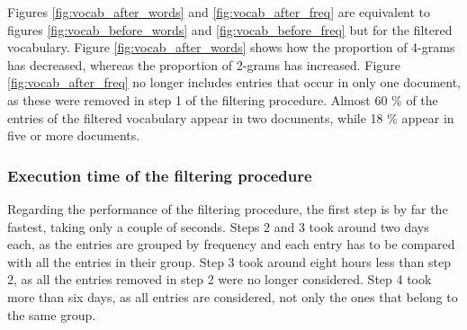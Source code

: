 Figures \ref{fig:vocab_after_words} and \ref{fig:vocab_after_freq} are equivalent to figures \ref{fig:vocab_before_words} and \ref{fig:vocab_before_freq} but for the filtered vocabulary. Figure \ref{fig:vocab_after_words} shows how the proportion of 4-grams has decreased, whereas the proportion of 2-grams has increased. Figure \ref{fig:vocab_after_freq} no longer includes entries that occur in only one document, as these were removed in step 1 of the filtering procedure. Almost 60 \% of the entries of the filtered vocabulary appear in two documents, while 18 \% appear in five or more documents.

\subsubsection{Execution time of the filtering procedure}

Regarding the performance of the filtering procedure, the first step is by far the fastest, taking only a couple of seconds. Steps 2 and 3 took around two days each, as the entries are grouped by frequency and each entry has to be compared with all the entries in their group. Step 3 took around eight hours less than step 2, as all the entries removed in step 2 were no longer considered. Step 4 took more than six days, as all entries are considered, not only the ones that belong to the same group.

